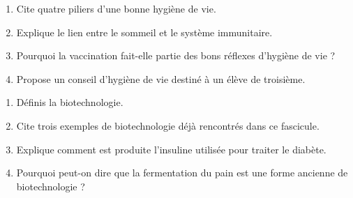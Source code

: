 \begin{enumerate}[label=\arabic*)]
\item Cite quatre piliers d'une bonne hygiène de vie.
\item Explique le lien entre le sommeil et le système immunitaire.
\item Pourquoi la vaccination fait-elle partie des bons réflexes d'hygiène de vie ?
\item Propose un conseil d'hygiène de vie destiné à un élève de troisième.
\end{enumerate}

\sujetbac[La biotechnologie]
\begin{enumerate}[label=\arabic*)]
\item Définis la biotechnologie.
\item Cite trois exemples de biotechnologie déjà rencontrés dans ce fascicule.
\item Explique comment est produite l'insuline utilisée pour traiter le diabète.
\item Pourquoi peut-on dire que la fermentation du pain est une forme ancienne de
biotechnologie ?
\end{enumerate}

